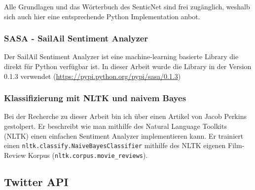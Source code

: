 Alle Grundlagen und das Wörterbuch des SenticNet sind frei zugänglich, weshalb sich auch hier eine entsprechende Python Implementation anbot.

\subsubsection{SASA - SailAil Sentiment Analyzer}
Der SailAil Sentiment Analyzer ist eine machine-learning basierte Library die direkt für Python verfügbar ist. In dieser Arbeit wurde die Library in der Version 0.1.3 verwendet (\url{https://pypi.python.org/pypi/sasa/0.1.3})

\subsubsection{Klassifizierung mit NLTK und naivem Bayes}
Bei der Recherche zu dieser Arbeit bin ich über einen Artikel von Jacob Perkins \cite{nltkbayes} gestolpert. Er beschreibt wie man mithilfe des Natural Language Toolkits (NLTK) \cite{nltk} einen einfachen Sentiment Analyzer implementieren kann. Er trainiert einen \lstinline$nltk.classify.NaiveBayesClassifier$ mithilfe des NLTK eigenen Film-Review Korpus (\lstinline$nltk.corpus.movie_reviews$).

\subsection{Twitter API}
